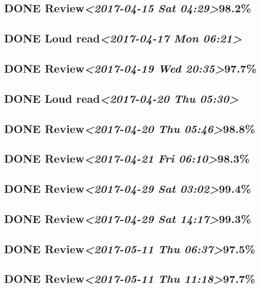\documentclass[11pt]{ctexart}
\begin{document}
\subsection{{\bfseries\sffamily DONE} Review\textit{<2017-04-15 Sat 04:29>}98.2\%}
\label{sec:org8626e26}
\subsection{{\bfseries\sffamily DONE} Loud read\textit{<2017-04-17 Mon 06:21>}}
\label{sec:org29b8bc7}
\subsection{{\bfseries\sffamily DONE} Review\textit{<2017-04-19 Wed 20:35>}97.7\%}
\label{sec:orga0f7d8f}
\subsection{{\bfseries\sffamily DONE} Loud read\textit{<2017-04-20 Thu 05:30>}}
\label{sec:orgc947663}
\subsection{{\bfseries\sffamily DONE} Review\textit{<2017-04-20 Thu 05:46>}98.8\%}
\label{sec:org3ad9053}
\subsection{{\bfseries\sffamily DONE} Review\textit{<2017-04-21 Fri 06:10>}98.3\%}
\label{sec:org90fc409}
\subsection{{\bfseries\sffamily DONE} Review\textit{<2017-04-29 Sat 03:02>}99.4\%}
\label{sec:org1d757d0}
\subsection{{\bfseries\sffamily DONE} Review\textit{<2017-04-29 Sat 14:17>}99.3\%}
\label{sec:org057ca03}
\subsection{{\bfseries\sffamily DONE} Review\textit{<2017-05-11 Thu 06:37>}97.5\%}
\label{sec:orge4c50c9}
\subsection{{\bfseries\sffamily DONE} Review\textit{<2017-05-11 Thu 11:18>}97.7\%}
\label{sec:org955c28d}
\end{document}

